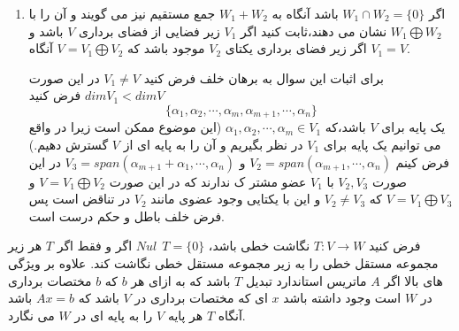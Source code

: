 \documentclass{article}
\begin{document}
\begin{enumerate}
\begin{حل}
		
	\end{حل}
	\item 
	اگر 
	$W_1\cap W_2=\{0\}$
	باشد آنگاه به 
	$W_1+W_2$
	جمع مستقیم نیز می گویند و آن را با 
	$W_1\bigoplus W_2$
	نشان می دهند،ثابت کنید اگر 
	$V_1$
	زیر فضایی از فضای برداری 
	$V$
	باشد و اگر زیر فضای برداری یکتای 
	$V_2$
	موجود باشد که 
	$V=V_1\bigoplus V_2$
	آنگاه 
	$V_1=V$.
	\begin{حل}
	برای اثبات این سوال به برهان خلف فرض کنید 
	$V_1\neq V$
	در این صورت 
	$dim V_1< dim V$
	فرض کنید
	$$\{\alpha_1,\alpha_2,\cdots,\alpha_m,\alpha_{m+1},\cdots,\alpha_n\}$$
	یک پایه برای 
	$V$
	باشد،که 	
	$\alpha_1,\alpha_2,\cdots,\alpha_m\in V_1$
	(این موضوع ممکن است زیرا در واقع می توانیم یک پایه برای 
	$V_1$
	در نظر بگیریم و آن را به پایه ای از 
	$V$
	گسترش دهیم.)
	فرض کینم 
	$V_2=span(\alpha_{m+1},\cdots,\alpha_n)$
	و 
	$V_3=span(\alpha_{m+1}+\alpha_1,\cdots,\alpha_n)$
	در این صورت 
	$V_2,V_3$
	با
	$V_1$
	عضو مشتر ک ندارند که در این صورت
	$V=V_1\bigoplus V_2$
	و
	$V=V_1\bigoplus V_3$
	که 
	$V_2\neq V_3$
	و این با یکتایی وجود عضوی مانند 
	$V_2$
	در تناقض است پس فرض خلف باطل و حکم درست است.
	
	\end{حل}
	
\end{enumerate}
فرض کنید 
$T:V\longrightarrow W$
نگاشت خطی باشد،
$Nul\ \ T=\{0\}$
اگر و فقط اگر 
$T$
هر زیر مجموعه مستقل خطی را به زیر مجموعه مستقل خطی نگاشت کند. علاوه بر ویژگی های بالا اگر 
$A$
ماتریس استاندارد تبدیل 
$T$
باشد که به ازای هر 
$b$
که 
$b$
مختصات برداری در 
$W$
است وجود داشته باشد 
$x$
ای که مختصات برداری در 
$V$
 باشد که
 $Ax=b$
 باشد آنگاه 
 $T$
 هر پایه
 $V$
  را به پایه ای در 
  $W$
   می نگارد.
\end{document}
